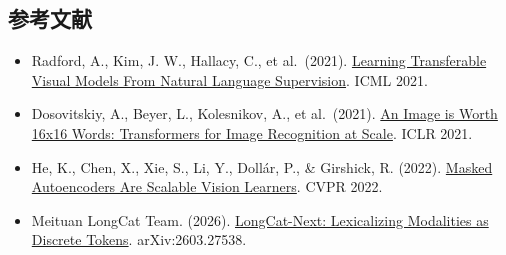 \hypertarget{ux53c2ux8003ux6587ux732e-78}{%
\subsection{参考文献}\label{ux53c2ux8003ux6587ux732e-78}}

\vspace{0.25em}
\begin{itemize}
\tightlist
\item
  Radford, A., Kim, J. W., Hallacy, C., et al.~(2021). \href{https://arxiv.org/abs/2103.00020}{Learning Transferable Visual Models From Natural Language Supervision}. ICML 2021.
\item
  Dosovitskiy, A., Beyer, L., Kolesnikov, A., et al.~(2021). \href{https://arxiv.org/abs/2010.11929}{An Image is Worth 16x16 Words: Transformers for Image Recognition at Scale}. ICLR 2021.
\item
  He, K., Chen, X., Xie, S., Li, Y., Dollár, P., \& Girshick, R. (2022). \href{https://arxiv.org/abs/2111.06377}{Masked Autoencoders Are Scalable Vision Learners}. CVPR 2022.
\item
  Meituan LongCat Team. (2026). \href{https://arxiv.org/abs/2603.27538}{LongCat-Next: Lexicalizing Modalities as Discrete Tokens}. arXiv:2603.27538.
\end{itemize}

\clearpage
